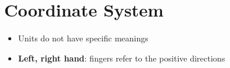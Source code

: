 \section{Coordinate System}

\begin{itemize}
  \item Units do not have specific meanings
  \item \textbf{Left, right hand}: fingers refer to the positive directions
\end{itemize}
